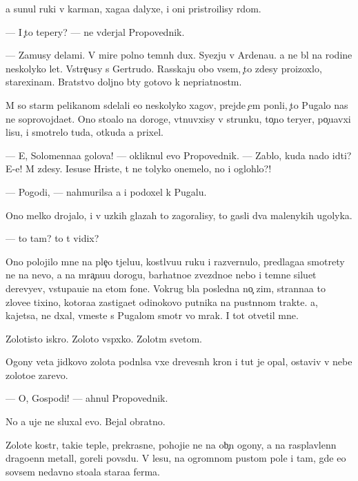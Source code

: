\documentclass[10pt]{book}
\begin{document}
{\Y}a sunul ruki v karman{\yi}, xaga{\y}a dalyxe, i oni pristro{\y}ilisy r{\ia}dom.

— I {\c}to tepery? — ne v{\yi}derjal Propovednik.

— Za{\y}musy delami. V mire polno temn{\yi}h dux. Syezju v Ardenau. {\Y}a ne b{\yi}l na rodine neskolyko let. Vstre{\c}usy s Gertrudo{\y}. Rasskaju obo vsem, {\c}to zdesy pro{\y}izoxlo, stare{\y}xinam. Bratstvo doljno b{\yi}ty gotovo k nepri{\y}atnost{\ia}m.

M{\yi} so star{\yi}m pelikanom sdelali {\y}e{\x}o neskolyko xagov, prejde {\c}em pon{\ia}li, {\c}to Pugalo nas ne soprovojda{\y}et. Ono sto{\y}alo na doroge, v{\yi}t{\ia}nuvxisy v strunku, to{\c}no teryer, po{\c}u{\y}avxi{\y} lisu, i smotrelo tuda, otkuda {\y}a prixel.

— E{\y}, Solomenna{\y}a golova! — okliknul {\y}evo Propovednik. — Zab{\yi}lo, kuda nado idti? E-e{\y}! M{\yi} zdesy. Iesuse Hriste, t{\yi} ne tolyko onemelo, no i oglohlo?!

— Pogodi, — nahmurilsa {\y}a i podoxel k Pugalu.

Ono melko drojalo, i v uzkih glazah to zagoralisy, to gasli dva malenykih ugolyka.

— {\C}to tam? {\C}to t{\yi} vidix?

Ono polojilo mne na ple{\c}o t{\ia}jelu{\y}u, kostl{\ia}vu{\y}u ruku i razvernulo, predlaga{\y}a smotrety ne na nevo, a na mra{\c}nu{\y}u dorogu, barhatno{\y}e zvezdno{\y}e nebo i temn{\yi}{\y}e siluet{\yi} derevyev, v{\yi}stupa{\y}u{\x}i{\y}e na etom fone. Vokrug b{\yi}la posledn{\ia}{\y}a no{\c} zim{\yi}, stranna{\y}a to{\y} zlove{\x}e{\y} tixino{\y}, kotora{\y}a zastiga{\y}et odinokovo putnika na pust{\yi}nnom trakte. {\Y}a, kajetsa, ne d{\yi}xal, vmeste s Pugalom smotr{\ia} vo mrak. I tot otvetil mne.

Zolotisto{\y} iskro{\y}. Zoloto{\y} vsp{\yi}xko{\y}. Zolot{\yi}m svetom.

Ogony {\q}veta jidkovo zolota podn{\ia}lsa v{\yi}xe drevesn{\yi}h kron i tut je opal, ostaviv v nebe zoloto{\y}e zarevo.

— O, Gospodi! — ahnul Propovednik.

No {\y}a uje ne sluxal {\y}evo. Bejal obratno.



Zolot{\yi}{\y}e kostr{\yi}, taki{\y}e tepl{\yi}{\y}e, prekrasn{\yi}{\y}e, pohoji{\y}e ne na ob{\yi}{\c}n{\yi}{\y} ogony, a na rasplavlenn{\yi}{\y} drago{\q}enn{\yi}{\y} metall, goreli povs{\iu}du. V lesu, na ogromnom pustom pole i tam, gde {\y}e{\x}o sovsem nedavno sto{\y}ala stara{\y}a ferma.
\end{document}
